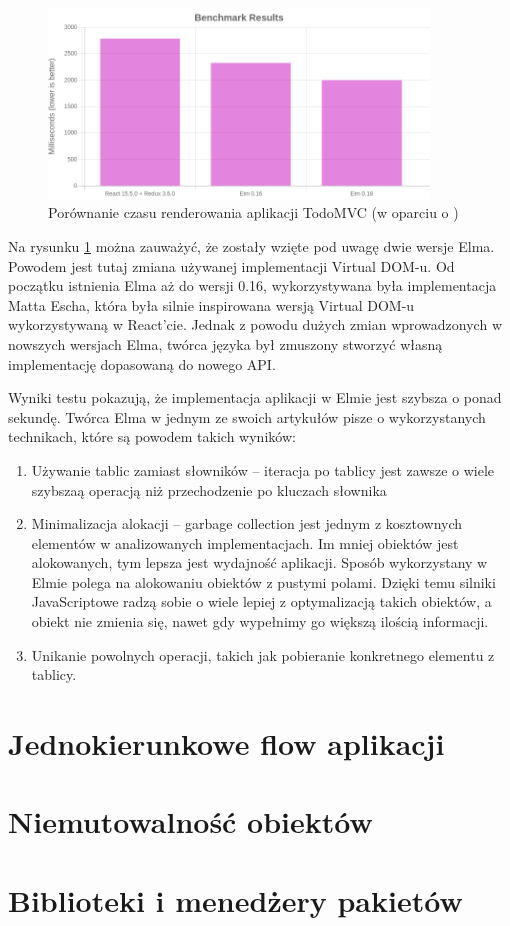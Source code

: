 \begin{figure}[h]
	\centering
	\includegraphics[width=0.9\textwidth]{images/render_comparision}
	\caption{Porównanie czasu renderowania aplikacji TodoMVC (w oparciu o \cite{perComp})}
	\label{fig:performanceComparision}
\end{figure}

Na rysunku \ref{fig:performanceComparision} można zauważyć, że zostały wzięte pod uwagę dwie wersje Elma. Powodem jest tutaj zmiana używanej implementacji Virtual DOM-u. Od początku istnienia Elma aż do wersji 0.16, wykorzystywana była implementacja Matta Escha, która była silnie inspirowana wersją Virtual DOM-u wykorzystywaną w React'cie. Jednak z powodu dużych zmian wprowadzonych w nowszych wersjach Elma, twórca języka był zmuszony stworzyć własną implementację dopasowaną do nowego API. 

Wyniki testu pokazują, że implementacja aplikacji w Elmie jest szybsza o ponad sekundę. Twórca Elma w jednym ze swoich artykułów \cite{blazingFastHtml} pisze o wykorzystanych technikach, które są powodem takich wyników:
\begin{enumerate}
	\item Używanie tablic zamiast słowników -- iteracja po tablicy jest zawsze o wiele szybszaą operacją niż przechodzenie po kluczach słownika
	\item Minimalizacja alokacji -- garbage collection jest jednym z kosztownych elementów w analizowanych implementacjach. Im mniej obiektów jest alokowanych, tym lepsza jest wydajność aplikacji. Sposób wykorzystany w Elmie polega na alokowaniu obiektów z pustymi polami. Dzięki temu silniki JavaScriptowe radzą sobie o wiele lepiej z optymalizacją takich obiektów, a obiekt nie zmienia się, nawet gdy wypełnimy go większą ilością informacji.
	\item Unikanie powolnych operacji, takich jak pobieranie konkretnego elementu z tablicy. 
\end{enumerate}
\section{Jednokierunkowe flow aplikacji}

\section{Niemutowalność obiektów}

\section{Biblioteki i menedżery pakietów}
